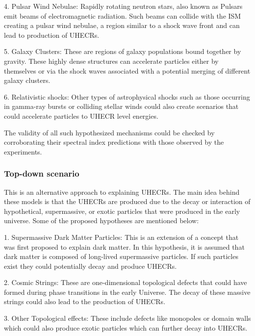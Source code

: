 4. Pulsar Wind Nebulae: Rapidly rotating neutron stars, also known as Pulsars emit beams of electromagnetic radiation. Such beams can collide with the ISM creating a pulsar wind nebulae, a region similar to a shock wave front and can lead to production of \glspl{UHECR}.~\cite{Cerutti_2020}

5. Galaxy Clusters: These are regions of galaxy populations bound together by gravity. These highly dense structures can accelerate particles either by themselves or via the shock waves associated with a potential merging of different galaxy clusters.~\cite{Murase_2008,Condorelli_2023} 

6. Relativistic shocks: Other types of astrophysical shocks such as those occurring in gamma-ray bursts or colliding stellar winds could also create scenarios that could accelerate particles to \gls{UHECR} level energies.~\cite{Kirk_2000,10.1046/j.1365-8711.2001.04851.x}

The validity of all such hypothesized mechanisms could be checked by corroborating their spectral index predictions with those observed by the experiments. 

\subsubsection{Top-down scenario}
\label{subsec:Tdownsce}
This is an alternative approach to explaining \glspl{UHECR}. The main idea behind these models is that the \glspl{UHECR} are produced due to the decay or interaction of hypothetical, supermassive, or exotic particles that were produced in the early universe. Some of the proposed hypotheses are mentioned below:

1. Supermassive Dark Matter Particles: This is an extension of a concept that was first proposed to explain dark matter. In this hypothesis, it is assumed that dark matter is composed of long-lived supermassive particles. If such particles exist they could potentially decay and produce \glspl{UHECR}.~\cite{ALOISIO2008307,MARZOLA201756}

2. Cosmic Strings: These are one-dimensional topological defects that could have formed during phase transitions in the early Universe. The decay of these massive strings could also lead to the production of \glspl{UHECR}.~\cite{BHATTACHARJEE2000109,PhysRevD.64.043004}

3. Other Topological effects: These include defects like monopoles or domain walls which could also produce exotic particles which can further decay into \glspl{UHECR}.~\cite{PhysRevLett.79.5202} 

